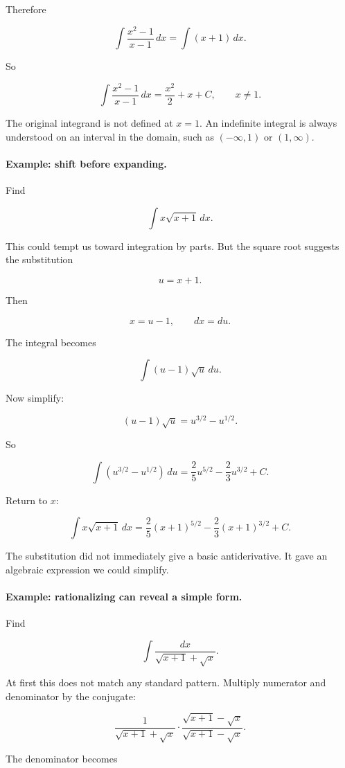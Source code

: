Therefore

\[
\int \frac{x^2-1}{x-1}\,dx
=
\int (x+1)\,dx.
\]

So

\[
\boxed{
\int \frac{x^2-1}{x-1}\,dx
=
\frac{x^2}{2}+x+C,
\qquad x\neq1.
}
\]

The original integrand is not defined at \(x=1\).  An indefinite integral is always
understood on an interval in the domain, such as \((-\infty,1)\) or \((1,\infty)\).

\paragraph{Example: shift before expanding.}
Find

\[
\int x\sqrt{x+1}\,dx.
\]

This could tempt us toward integration by parts.  But the square root suggests the
substitution

\[
u=x+1.
\]

Then

\[
x=u-1,
\qquad
dx=du.
\]

The integral becomes

\[
\int (u-1)\sqrt{u}\,du.
\]

Now simplify:

\[
(u-1)\sqrt{u}=u^{3/2}-u^{1/2}.
\]

So

\[
\int (u^{3/2}-u^{1/2})\,du
=
\frac{2}{5}u^{5/2}-\frac{2}{3}u^{3/2}+C.
\]

Return to \(x\):

\[
\boxed{
\int x\sqrt{x+1}\,dx
=
\frac{2}{5}(x+1)^{5/2}
-
\frac{2}{3}(x+1)^{3/2}
+C.
}
\]

The substitution did not immediately give a basic antiderivative.  It gave an algebraic
expression we could simplify.

\paragraph{Example: rationalizing can reveal a simple form.}
Find

\[
\int \frac{dx}{\sqrt{x+1}+\sqrt{x}}.
\]

At first this does not match any standard pattern.  Multiply numerator and denominator
by the conjugate:

\[
\frac{1}{\sqrt{x+1}+\sqrt{x}}
\cdot
\frac{\sqrt{x+1}-\sqrt{x}}{\sqrt{x+1}-\sqrt{x}}.
\]

The denominator becomes

